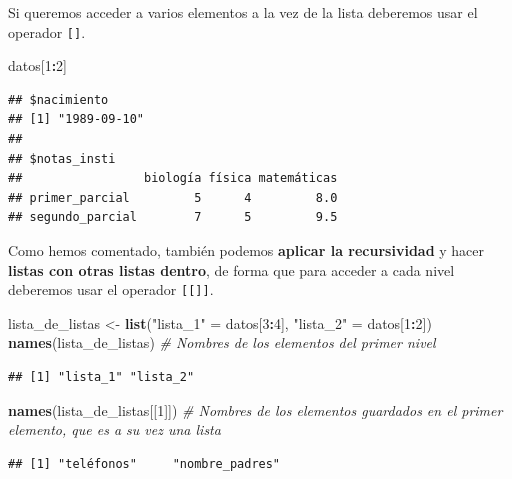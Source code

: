 \documentclass[11pt,]{book}
\newenvironment{Shaded}{\begin{snugshade}}{\end{snugshade}}
\newcommand{\CommentTok}[1]{\textcolor[rgb]{0.37,0.37,0.37}{\textit{#1}}}
\newcommand{\DecValTok}[1]{\textcolor[rgb]{0.06,0.06,0.06}{#1}}
\newcommand{\KeywordTok}[1]{\textcolor[rgb]{0.27,0.27,0.27}{\textbf{#1}}}
\newcommand{\NormalTok}[1]{#1}
\newcommand{\OperatorTok}[1]{\textcolor[rgb]{0.43,0.43,0.43}{\textbf{#1}}}
\newcommand{\StringTok}[1]{\textcolor[rgb]{0.5,0.5,0.5}{#1}}
\begin{document}
Si queremos acceder a varios elementos a la vez de la lista deberemos usar el operador \texttt{{[}{]}}.

\begin{Shaded}
\begin{Highlighting}[]
\NormalTok{datos[}\DecValTok{1}\OperatorTok{:}\DecValTok{2}\NormalTok{]}
\end{Highlighting}
\end{Shaded}

\begin{verbatim}
## $nacimiento
## [1] "1989-09-10"
## 
## $notas_insti
##                 biología física matemáticas
## primer_parcial         5      4         8.0
## segundo_parcial        7      5         9.5
\end{verbatim}

Como hemos comentado, también podemos \textbf{aplicar la recursividad} y hacer \textbf{listas con otras listas dentro}, de forma que para acceder a cada nivel deberemos usar el operador \texttt{{[}{[}{]}{]}}.

\begin{Shaded}
\begin{Highlighting}[]
\NormalTok{lista_de_listas <-}\StringTok{ }\KeywordTok{list}\NormalTok{(}\StringTok{"lista_1"}\NormalTok{ =}\StringTok{ }\NormalTok{datos[}\DecValTok{3}\OperatorTok{:}\DecValTok{4}\NormalTok{], }\StringTok{"lista_2"}\NormalTok{ =}\StringTok{ }\NormalTok{datos[}\DecValTok{1}\OperatorTok{:}\DecValTok{2}\NormalTok{])}
\KeywordTok{names}\NormalTok{(lista_de_listas) }\CommentTok{# Nombres de los elementos del primer nivel}
\end{Highlighting}
\end{Shaded}

\begin{verbatim}
## [1] "lista_1" "lista_2"
\end{verbatim}

\begin{Shaded}
\begin{Highlighting}[]
\KeywordTok{names}\NormalTok{(lista_de_listas[[}\DecValTok{1}\NormalTok{]]) }\CommentTok{# Nombres de los elementos guardados en el primer elemento, que es a su vez una lista}
\end{Highlighting}
\end{Shaded}

\begin{verbatim}
## [1] "teléfonos"     "nombre_padres"
\end{verbatim}
\end{document}
